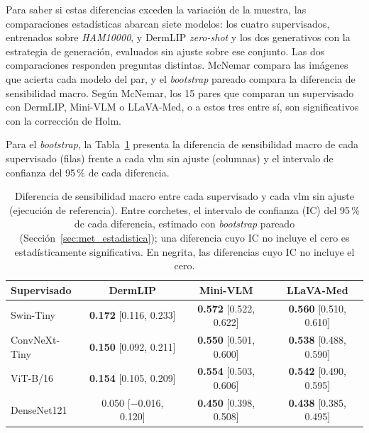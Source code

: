 Para saber si estas diferencias exceden la variación de la muestra, las comparaciones estadísticas abarcan siete modelos: los cuatro supervisados, entrenados sobre \emph{HAM10000}, y
DermLIP \emph{zero-shot} y los dos generativos con la estrategia de generación, evaluados sin ajuste sobre ese conjunto. Las dos comparaciones responden preguntas distintas. McNemar compara las imágenes que acierta cada modelo del
par, y el \emph{bootstrap} pareado compara la diferencia de sensibilidad macro. Según McNemar, los 15 pares que
comparan un supervisado con DermLIP, Mini-VLM o LLaVA-Med, o a estos tres entre sí, son significativos con la corrección
de Holm.

Para el \emph{bootstrap}, la Tabla~\ref{tab:res_pruebas_vlm} presenta la diferencia de sensibilidad macro de cada
supervisado (filas) frente a cada \gls{vlm} sin ajuste (columnas) y el intervalo de confianza del 95\,\% de cada
diferencia.

\begin{table}[H]
    \centering
    \caption{Diferencia de sensibilidad macro entre cada supervisado y cada \gls{vlm} sin ajuste (ejecución de referencia). Entre corchetes, el intervalo de confianza (IC) del 95\,\% de cada diferencia, estimado con \emph{bootstrap} pareado (Sección~\ref{sec:met_estadistica}); una diferencia cuyo IC no incluye el cero es estadísticamente significativa. En negrita, las diferencias cuyo IC no incluye el cero.}
    \label{tab:res_pruebas_vlm}
    \small
    \setlength{\tabcolsep}{4pt}
    \begin{tabularx}{\textwidth}{@{}>{\raggedright\arraybackslash}X ccc@{}}
        \toprule
        \textbf{Supervisado} & \textbf{DermLIP} & \textbf{Mini-VLM} & \textbf{LLaVA-Med} \\
        \midrule
        Swin-Tiny & \textbf{0.172} [0.116, 0.233] & \textbf{0.572} [0.522, 0.622] & \textbf{0.560} [0.510, 0.610] \\
        ConvNeXt-Tiny & \textbf{0.150} [0.092, 0.211] & \textbf{0.550} [0.501, 0.600] & \textbf{0.538} [0.488, 0.590] \\
        ViT-B/16 & \textbf{0.154} [0.105, 0.209] & \textbf{0.554} [0.503, 0.606] & \textbf{0.542} [0.490, 0.595] \\
        DenseNet121 & 0.050 [$-$0.016, 0.120] & \textbf{0.450} [0.398, 0.508] & \textbf{0.438} [0.385, 0.495] \\
        \bottomrule
    \end{tabularx}
\end{table}

